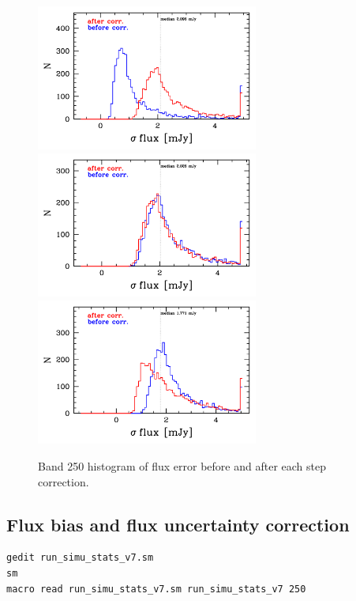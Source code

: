 \documentclass[11pt,a4paper]{article}
\begin{document}
\begin{figure}[H]
	\caption{
		Band 250 histogram of flux error before and after each step correction. 
	}
	\includegraphics[width=0.65\textwidth]{galsim_250_hist_uncertainty_1}
	\includegraphics[width=0.65\textwidth]{galsim_250_hist_uncertainty_2}
	\includegraphics[width=0.65\textwidth]{galsim_250_hist_uncertainty_3}
\end{figure}


\subsection{Flux bias and flux uncertainty correction}
\label{Band250_dfcorr}

\begin{lstlisting}[language=bash]
gedit run_simu_stats_v7.sm
sm
macro read run_simu_stats_v7.sm run_simu_stats_v7 250
\end{lstlisting}
\end{document}
